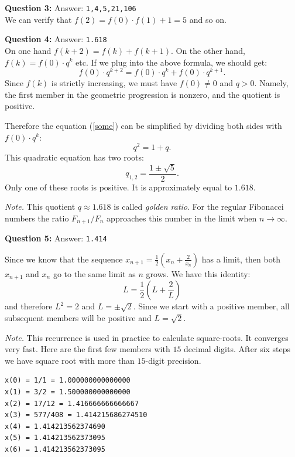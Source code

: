\documentclass[jou]{apa6}
\begin{document}
\vspace{6pt}
{\bf Question 3:} Answer: {\tt 1,4,5,21,106}\\
We can verify that $f(2) = f(0)\cdot f(1) + 1 = 5$ and so on.

\vspace{6pt}
{\bf Question 4:} Answer: {\tt 1.618}\\
On one hand $f(k+2) = f(k) + f(k+1)$. On the other hand, 
$f(k) = f(0)\cdot q^k$ etc. If we plug into the above formula, we should get:
\begin{equation}
\label{some}
f(0) \cdot q^{k+2} = f(0) \cdot q^k + f(0) \cdot q^{k+1}.
\end{equation}
Since $f(k)$ is strictly increasing, we must have $f(0) \neq 0$ and 
$q > 0$. Namely, the first member in the geometric progression is nonzero, 
and the quotient is positive. 

Therefore the equation (\ref{some}) can be simplified by dividing both sides
with $f(0) \cdot q^k$:
$$q^2 = 1 + q.$$
This quadratic equation has two roots: 
$$q_{1,2} = \frac{1 \pm \sqrt{5}}{2}.$$
Only one of these roots is positive. It is approximately equal to $1.618$. 

{\em Note.} This quotient $q \approx 1.618$ is called {\em golden ratio}. 
For the regular Fibonacci numbers the ratio $F_{n+1}/F_{n}$ approaches 
this number in the limit when $n \rightarrow \infty$.


\vspace{6pt}
{\bf Question 5:} Answer: {\tt 1.414}

Since we know that the sequence 
$x_{n+1} = \frac{1}{2} \left( x_n + \frac{2}{x_n}\right)$ has a limit, then 
both $x_{n+1}$ and $x_n$ go to the same limit as $n$ grows. We have this identity:
$$L = \frac{1}{2} \left (L + \frac{2}{L} \right)$$
and therefore $L^2 =2$ and $L = \pm \sqrt{2}$. Since we start with a positive member, 
all subsequent members will be positive and $L = \sqrt{2}$.

{\em Note.} This recurrence is used in practice to calculate 
square-roots. It converges very fast. Here are the first few members with $15$ decimal digits. 
After six steps we have square root with more than $15$-digit precision.
\begin{verbatim}
x(0) = 1/1 = 1.000000000000000
x(1) = 3/2 = 1.500000000000000
x(2) = 17/12 = 1.416666666666667
x(3) = 577/408 = 1.414215686274510
x(4) = 1.414213562374690
x(5) = 1.414213562373095
x(6) = 1.414213562373095
\end{verbatim}
\end{document}
